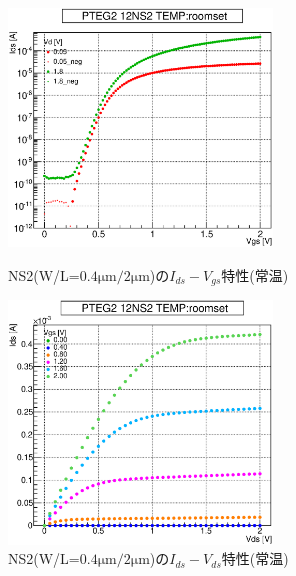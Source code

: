 				\begin{figure}[htbp]
					\begin{minipage}{0.5\hsize}
						\begin{center}
							\includegraphics[width=70mm]{./Chapter/Appendix/Picture/NST/NS2/PTEG2_12_NS2_IdVg_roomset.eps}
						\end{center}
						\caption{NS2(W/L=$0.4\mathrm{\mu m}/2\mathrm{\mu m}$)の$I_{ds}-V_{gs}$特性(常温)}
						\label{fig:NS2_IdVg_room}
					\end{minipage}
					\begin{minipage}{0.5\hsize}
						\begin{center}
							\includegraphics[width=70mm]{./Chapter/Appendix/Picture/NST/NS2/PTEG2_12_NS2_IdVd_roomset.eps}
						\end{center}
						\caption{NS2(W/L=$0.4\mathrm{\mu m}/2\mathrm{\mu m}$)の$I_{ds}-V_{ds}$特性(常温)}
						\label{fig:NS2_IdVd_room}
					\end{minipage}
				\end{figure}
